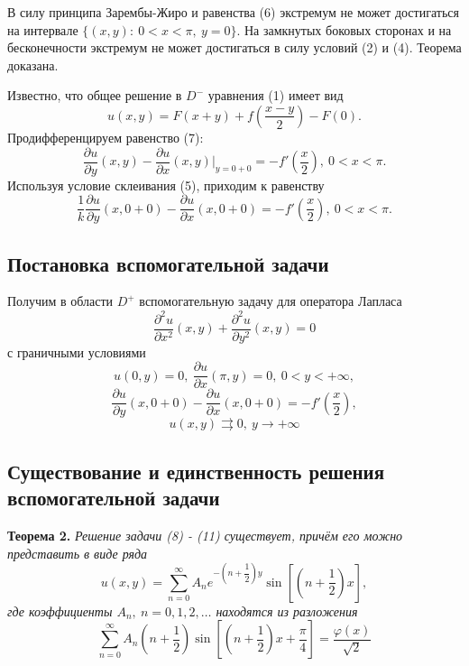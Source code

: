 \documentclass[12pt, a4paper]{article}
\begin{document}
В силу принципа Зарембы-Жиро и равенства (6) экстремум не может достигаться на интервале $\{(x,y):\ 0 < x < \pi, \ y = 0\}$. На замкнутых боковых сторонах и на бесконечности экстремум не может достигаться в силу условий (2) и (4). Теорема доказана.

Известно, что общее решение в $D^{-}$  уравнения (1) имеет вид 
\begin{equation}
	u(x,y) = F(x+y) + f(\dfrac{x-y}{2}) - F(0).
\end{equation}
Продифференцируем равенство (7):
\begin{equation*}
	\dfrac{\partial u}{\partial y}(x,y) - \dfrac{\partial u}{\partial x}(x,y) \vert_{y=0+0} = -f'\left(\dfrac{x}2\right), \ 0 < x < \pi.
\end{equation*}
Используя условие склеивания (5), приходим к равенству
\begin{equation*}
	\dfrac{1}{k} \dfrac{\partial u}{\partial y}(x, 0+0) - \dfrac{\partial u}{\partial x}(x, 0 + 0) = - f'\left(\dfrac{x}2\right), \ 0 < x < \pi. 
\end{equation*}

\subsection{Постановка вспомогательной задачи}
	Получим в области $D^{+}$ вспомогательную задачу для оператора Лапласа 
\begin{equation}
	\dfrac{\partial^2 u}{\partial x^2}(x,y) + \dfrac{\partial^2 u}{\partial y^2}(x,y) = 0
\end{equation}
с граничными условиями 
\begin{equation}
	u(0,y) = 0, \ \dfrac{\partial u}{\partial x}(\pi, y) = 0, \ 0 < y < +\infty, 
\end{equation}
\begin{equation}
	\dfrac{\partial u}{\partial y}(x,0+0) - \dfrac{\partial u}{\partial x}(x,0+0) = -f'\left(\dfrac{x}{2}\right),
\end{equation}
\begin{equation}
	u(x,y) \rightrightarrows 0, \ y \to +\infty 
\end{equation}


\subsection{Существование и единственность решения вспомогательной задачи}

\textbf{Теорема 2.} \textit{	Решение задачи (8) - (11) существует, причём его можно представить в виде ряда
	\begin{equation}
		u(x,y) = \sum\limits_{n=0}^{\infty} A_n e^{-\left(n + \dfrac12\right)y} \sin{\left[\left(n + \dfrac12\right)x\right]},
	\end{equation}
	где коэффициенты $A_n, \ n =0,1,2, \dots$ находятся из разложения
	\begin{equation}
		\sum\limits_{n=0}^{\infty} A_n \left(n + \dfrac12 \right) \sin{\left[\left(n +\dfrac12\right)x + \dfrac\pi4\right]} = \dfrac{\varphi(x)}{\sqrt2}
\end{equation}}
\end{document}
